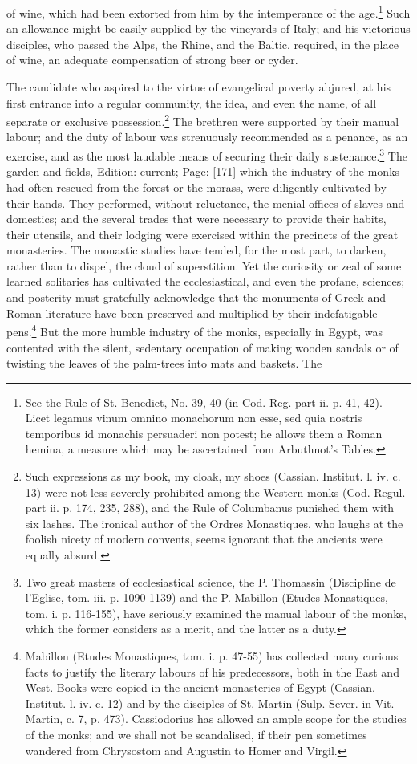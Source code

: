 of wine, which had been extorted from him by the intemperance of the age.\footnote{See the Rule of St. Benedict, No. 39, 40 (in Cod. Reg. part ii. p. 41, 42). Licet legamus vinum omnino monachorum non esse, sed quia nostris temporibus id monachis persuaderi non potest; he allows them a Roman hemina, a measure which may be ascertained from Arbuthnot\texthebrew{}’s Tables.} Such an allowance might be easily supplied by the vineyards of Italy; and his victorious disciples, who passed the Alps, the Rhine, and the Baltic, required, in the place of wine, an adequate compensation of strong beer or cyder.

The candidate who aspired to the virtue of evangelical poverty abjured, at his first entrance into a regular community, the idea, and even the name, of all separate or exclusive possession.\footnote{Such expressions as my book, my cloak, my shoes (Cassian. Institut. l. iv. c. 13) were not less severely prohibited among the Western monks (Cod. Regul. part ii. p. 174, 235, 288), and the Rule of Columbanus punished them with six lashes. The ironical author of the Ordres Monastiques, who laughs at the foolish nicety of modern convents, seems ignorant that the ancients were equally absurd.} The brethren were supported by their manual labour; and the duty of labour was strenuously recommended as a penance, as an exercise, and as the most laudable means of securing their daily sustenance.\footnote{Two great masters of ecclesiastical science, the P. Thomassin (Discipline de l\texthebrew{}’Eglise, tom. iii. p. 1090-1139) and the P. Mabillon (Etudes Monastiques, tom. i. p. 116-155), have seriously examined the manual labour of the monks, which the former considers as a merit, and the latter as a duty.} The garden and fields, Edition: current; Page: [171] which the industry of the monks had often rescued from the forest or the morass, were diligently cultivated by their hands. They performed, without reluctance, the menial offices of slaves and domestics; and the several trades that were necessary to provide their habits, their utensils, and their lodging were exercised within the precincts of the great monasteries. The monastic studies have tended, for the most part, to darken, rather than to dispel, the cloud of superstition. Yet the curiosity or zeal of some learned solitaries has cultivated the ecclesiastical, and even the profane, sciences; and posterity must gratefully acknowledge that the monuments of Greek and Roman literature have been preserved and multiplied by their indefatigable pens.\footnote{Mabillon (Etudes Monastiques, tom. i. p. 47-55) has collected many curious facts to justify the literary labours of his predecessors, both in the East and West. Books were copied in the ancient monasteries of Egypt (Cassian. Institut. l. iv. c. 12) and by the disciples of St. Martin (Sulp. Sever. in Vit. Martin, c. 7, p. 473). Cassiodorius has allowed an ample scope for the studies of the monks; and we shall not be scandalised, if their pen sometimes wandered from Chrysostom and Augustin to Homer and Virgil.} But the more humble industry of the monks, especially in Egypt, was contented with the silent, sedentary occupation of making wooden sandals or of twisting the leaves of the palm-trees into mats and baskets. The 